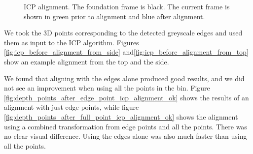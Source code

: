 \documentclass[12pt,a4paper,onecolumn]{article}
\begin{document}
\begin{figure}[h]
    \centering
      \caption{ICP alignment.  The foundation frame is black.  The current frame is shown in green prior to alignment and blue after alignment.}
\end{figure}

We took the 3D points corresponding to the detected greyscale edges and used them as input to the ICP algorithm.  Figures \ref{fig:icp_before_alignment_from_side} and\ref{fig:icp_before_alignment_from_top} show an example alignment from the top and the side.

We found that aligning with the edges alone produced good results, and we did not see an improvement when using all the points in the bin.  Figure \ref{fig:depth_points_after_edge_point_icp_alignment_ok} shows the results of an alignment with just edge points, while figure \ref{fig:depth_points_after_full_point_icp_alignment_ok} shows the alignment using a combined transformation from edge points and all the points.  There was no clear visual difference.  Using the edges alone was also much faster than using all the points.
\end{document}
